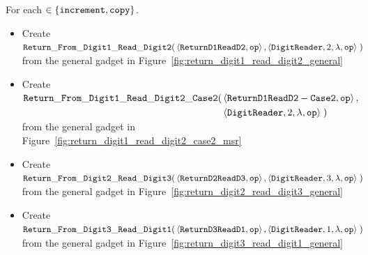 \noindent For each {\inc} $\in \{ {\tt increment, copy } \}$.


\begin{itemize}
    \item Create
    $\begin{aligned}[t]
        {\tt Return\_From\_Digit1\_Read\_Digit2}(& \left \langle {\tt ReturnD1ReadD2},          {\tt op} \right\rangle,
                                  \left \langle {\tt DigitReader}, 2, \lambda, {\tt op} \right\rangle \;)
    \end{aligned}$ \\ from the general gadget in Figure~\ref{fig:return_digit1_read_digit2_general}

    \item Create
    $\begin{aligned}[t]
        {\tt Return\_From\_Digit1\_Read\_Digit2\_Case2}(& \left\langle {\tt ReturnD1ReadD2-Case2},    {\tt op} \right\rangle, \\
                                       & \left\langle {\tt DigitReader}, 2, \lambda, {\tt op} \right\rangle \;)
    \end{aligned}$ \\ from the general gadget in Figure~\ref{fig:return_digit1_read_digit2_case2_msr}

    \item Create
    $\begin{aligned}[t]
        {\tt Return\_From\_Digit2\_Read\_Digit3}(& \left\langle {\tt ReturnD2ReadD3},           {\tt op} \right\rangle,
                                    \left\langle {\tt DigitReader},  3, \lambda, {\tt op} \right\rangle \;)
    \end{aligned}$ \\ from the general gadget in Figure~\ref{fig:return_digit2_read_digit3_general}

    \item Create
    $\begin{aligned}[t]
            {\tt Return\_From\_Digit3\_Read\_Digit1}(& \left \langle {\tt ReturnD3ReadD1},           {\tt op} \right\rangle,
                                        \left \langle {\tt DigitReader},  1, \lambda, {\tt op} \right\rangle \;)
    \end{aligned}$ \\ from the general gadget in Figure~\ref{fig:return_digit3_read_digit1_general}

\end{itemize}


